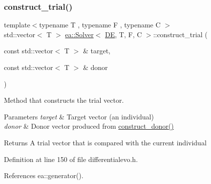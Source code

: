 \mbox{\label{classea_1_1_solver_3_01_d_e_00_01_t_00_01_f_00_01_c_01_4_a043f8134c53f09519283b8320d7a2ade}} 
\subsubsection{\texorpdfstring{construct\+\_\+trial()}{construct\_trial()}}
{\footnotesize\ttfamily template$<$typename T , typename F , typename C $>$ \\
std\+::vector$<$ T $>$ \hyperlink{classea_1_1_solver}{ea\+::\+Solver}$<$ \hyperlink{structea_1_1_d_e}{DE}, T, F, C $>$\+::construct\+\_\+trial (\begin{DoxyParamCaption}\item[{const std\+::vector$<$ T $>$ \&}]{target,  }\item[{const std\+::vector$<$ T $>$ \&}]{donor }\end{DoxyParamCaption})\hspace{0.3cm}{\ttfamily [private]}}



Method that constructs the trial vector. 


\begin{DoxyParams}{Parameters}
{\em target} & Target vector (an individual) \\
\hline
{\em donor} & Donor vector produced from \hyperlink{classea_1_1_solver_3_01_d_e_00_01_t_00_01_f_00_01_c_01_4_a69dabdddba116ddb5685355119bd77e0}{construct\+\_\+donor()} \\
\hline
\end{DoxyParams}
\begin{DoxyReturn}{Returns}
A trial vector that is compared with the current individual 
\end{DoxyReturn}


Definition at line 150 of file differentialevo.\+h.



References ea\+::generator().


